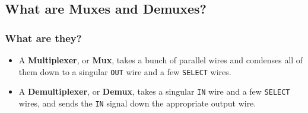 \documentclass{beamer}
\begin{document}
    
    	\subsection{What are Muxes and Demuxes?}
    	
    	\begin{frame}
    		\frametitle{What are they?}
    		\begin{itemize}
    			\item A \textbf{Multiplexer}, or \textbf{Mux}, takes a bunch of parallel wires and condenses all of them down to a singular \texttt{OUT} wire and a few \texttt{SELECT} wires.
    			\item A \textbf{Demultiplexer}, or \textbf{Demux}, takes a singular \texttt{IN} wire and a few \texttt{SELECT} wires, and sends the \texttt{IN} signal down the appropriate output wire.
    		\end{itemize}
    	\end{frame}
    	
\end{document}
